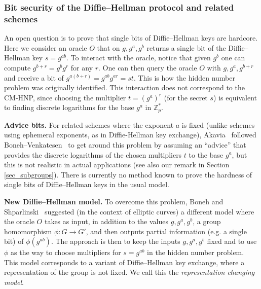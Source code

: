 \documentclass[11pt]{article}
\theoremstyle{definition}
\newcommand{\Z}{\mathbb{Z}}
\begin{document}
\subsubsection{Bit security of the Diffie--Hellman protocol and related schemes}

An open question is to prove that single bits of Diffie--Hellman keys are hardcore. Here we consider an oracle $O$ that on $g,g^a,g^b$ returns a single bit of the Diffie--Hellman key $s = g^{ab}$. To interact with the oracle, notice that given $g^b$ one can compute $g^{b+r} = g^b g^r$ for any $r$. One can then query the oracle $O$ with $g,g^a,g^{b+r}$ and receive a bit of $g^{a(b+r)} = g^{ab} g^{ar} = s t$.
This is how the hidden number problem was originally identified.
This interaction does not correspond to the CM-HNP, since choosing the multiplier $t = (g^a)^r$ (for the secret $s$) is equivalent to finding discrete logarithms for the base $g^a$ in $\Z^*_p$.

\noindent \textbf{Advice bits.} For related schemes where the exponent $a$ is fixed (unlike schemes using ephemeral exponents, as in Diffie-Hellman key exchange), Akavia~\cite{AKA-HNP} followed Boneh--Venkatesen~\cite{BV2} to get around this problem by assuming an ``advice'' that provides the discrete logarithms of the chosen multipliers $t$ to the base $g^a$, but this is not realistic in actual applications (see also our remark in Section \ref{sec_subgroups}).
There is currently no method known to prove the hardness of single bits of Diffie--Hellman keys in the usual model.


\noindent \textbf{New Diffie--Hellman model.} To overcome this problem, Boneh and Shparlinski~\cite{BS} suggested (in the context of elliptic curves) a different model where the oracle $O$ takes as input, in addition to the values $g, g^a, g^b$, a group homomorphism $\phi: G \to G'$, and then outputs partial information (e.g. a single bit) of $\phi(g^{ab})$. %
The approach is then to keep the inputs $g,g^a,g^b$ fixed and to use $\phi$ as the way to choose multipliers for $s=g^{ab}$ in the hidden number problem. This model corresponds to a variant of Diffie--Hellman key exchange, where a representation of the group is not fixed.
We call this the \emph{representation changing model}.
\end{document}
